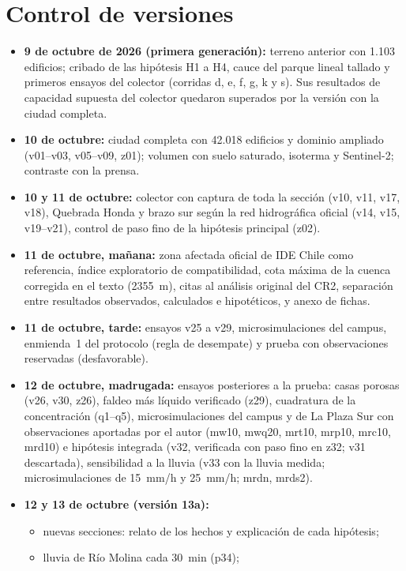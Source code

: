 \section*{Control de versiones}\label{sec:versiones}
\begin{itemize}
\item \textbf{9 de octubre de 2026 (primera generación):} terreno anterior con 1.103 edificios; cribado de las hipótesis H1 a H4, cauce del parque lineal tallado y primeros ensayos del colector (corridas d, e, f, g, k y s). Sus resultados de capacidad supuesta del colector quedaron superados por la versión con la ciudad completa.
\item \textbf{10 de octubre:} ciudad completa con 42.018 edificios y dominio ampliado (v01--v03, v05--v09, z01); volumen con suelo saturado, isoterma y Sentinel-2; contraste con la prensa.
\item \textbf{10 y 11 de octubre:} colector con captura de toda la sección (v10, v11, v17, v18), Quebrada Honda y brazo sur según la red hidrográfica oficial (v14, v15, v19--v21), control de paso fino de la hipótesis principal (z02).
\item \textbf{11 de octubre, mañana:} zona afectada oficial de IDE Chile como referencia, índice exploratorio de compatibilidad, cota máxima de la cuenca corregida en el texto (\SI{2355}{m}), citas al análisis original del CR2, separación entre resultados observados, calculados e hipotéticos, y anexo de fichas.
\item \textbf{11 de octubre, tarde:} ensayos v25 a v29, microsimulaciones del campus, enmienda~1 del protocolo (regla de desempate) y prueba con observaciones reservadas (desfavorable).
\item \textbf{12 de octubre, madrugada:} ensayos posteriores a la prueba: casas porosas (v26, v30, z26), faldeo más líquido verificado (z29), cuadratura de la concentración (q1--q5), microsimulaciones del campus y de La Plaza Sur con observaciones aportadas por el autor (mw10, mwq20, mrt10, mrp10, mrc10, mrd10) e hipótesis integrada (v32, verificada con paso fino en z32; v31 descartada), sensibilidad a la lluvia (v33 con la lluvia medida; microsimulaciones de \SI{15}{mm/h} y \SI{25}{mm/h}; mrdn, mrds2).
\item \textbf{12 y 13 de octubre (versión 13a):}
\begin{itemize}
\item nuevas secciones: relato de los hechos y explicación de cada hipótesis;
\item lluvia de Río Molina cada \SI{30}{min} (p34);

\end{itemize}
\end{itemize}
